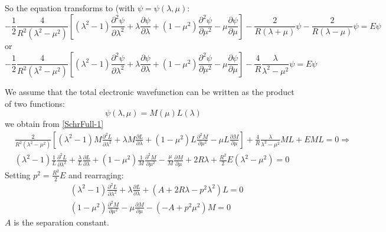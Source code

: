 So the equation transforms to (with $ \psi = \psi(\lambda, \mu) $:
\begin{equation}
-\frac{1}{2}\frac{4}{ R^2 (\lambda^2-\mu^2) }\left[(\lambda^2-1)\frac{\partial^2 \psi}{\partial \lambda^2} + \lambda\frac{\partial \psi}{\partial \lambda} + 
(1 - \mu^2)\frac{\partial^2 \psi}{\partial \mu^2} - \mu\frac{\partial \psi}{\partial \mu} \right] - \frac{2}{R(\lambda+\mu)}\psi - \frac{2}{R(\lambda-\mu)}\psi = E \psi
\end{equation}
or
\begin{equation}\label{SchrFull-1}
-\frac{1}{2}\frac{4}{ R^2 (\lambda^2-\mu^2) }\left[(\lambda^2-1)\frac{\partial^2 \psi}{\partial \lambda^2} + \lambda\frac{\partial \psi}{\partial \lambda} + 
(1 - \mu^2)\frac{\partial^2 \psi}{\partial \mu^2} - \mu\frac{\partial \psi}{\partial \mu} \right] - \frac{4}{R}\frac{\lambda}{\lambda^2-\mu^2}\psi = E \psi
\end{equation}

We assume that the total electronic wavefunction can be written as the product of two functions:
\begin{equation}\label{variables2C}
\psi(\lambda,\mu) = M(\mu)L(\lambda)
\end{equation}
we obtain from \eqref{SchrFull-1}
\begin{equation}
\begin{split}
& \frac{2}{ R^2 (\lambda^2-\mu^2) }\left[(\lambda^2-1)M\frac{\partial^2 L}{\partial \lambda^2} + \lambda M\frac{\partial L}{\partial \lambda} + 
(1 - \mu^2)L\frac{\partial^2 M}{\partial \mu^2} - \mu L\frac{\partial M}{\partial \mu} \right] + \frac{4}{R}\frac{\lambda}{\lambda^2-\mu^2} M L + E M L = 0 \Rightarrow \\[.8em]
& (\lambda^2-1)\frac{1}{L}\frac{\partial^2 L}{\partial \lambda^2} + \frac{\lambda}{L}\frac{\partial L}{\partial \lambda} + 
(1 - \mu^2)\frac{1}{M}\frac{\partial^2 M}{\partial \mu^2} - \frac{\mu}{M} \frac{\partial M}{\partial \mu} + 2R\lambda + \frac{R^2}{2} E (\lambda^2 - \mu^2) = 0 
\end{split}
\end{equation}
Setting $ p^2 = \frac{R^2}{2}E $ and rearraging:
\begin{equation}\label{eqLG}
\begin{split}
& (\lambda^2-1)\frac{\partial^2 L}{\partial \lambda^2} + \lambda\frac{\partial L}{\partial \lambda} + \left(A + 2R\lambda - p^2 \lambda^2\right) L = 0 \\[.8em]
& (1 - \mu^2)\frac{\partial^2 M}{\partial \mu^2} - \mu\frac{\partial M}{\partial \mu} - \left(-A + p^2 \mu^2\right) M = 0
\end{split}
\end{equation}
$ A $ is the separation constant.


